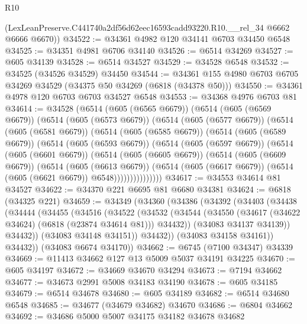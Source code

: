 \begin{lexlean}{R10}
\begin{coremodule}
      (LexLeanPreserve.C441740a2df56d62eec16593cadd93220.R10.__rel_34 @6662 @6666 @6670))
@34522 := @34361 @4982 @120 @34141 @6703 @34450 @6548
@34525 := @34351 @4981 @6706 @34140
@34526 := @6514 @34269
@34527 := @605 @34139
@34528 := @6514 @34527
@34529 := @34528 @6548
@34532 := @34525 (@34526 @34529) @34450
@34544 := @34361 @155 @4980 @6703 @6705 @34269 @34529 (@34375 @50 @34269 (@6818 (@34378 @50)))
@34550 := @34361 @4978 @120 @6703 @6703 @34527 @6548
@34553 := @34368 @4976 @6703 @81
@34614 := @34528
    (@6514
      (@605 (@6565 @6679))
      (@6514
        (@605 (@6569 @6679))
        (@6514
          (@605 (@6573 @6679))
          (@6514
            (@605 (@6577 @6679))
            (@6514
              (@605 (@6581 @6679))
              (@6514
                (@605 (@6585 @6679))
                (@6514
                  (@605 (@6589 @6679))
                  (@6514
                    (@605 (@6593 @6679))
                    (@6514
                      (@605 (@6597 @6679))
                      (@6514
                        (@605 (@6601 @6679))
                        (@6514
                          (@605 (@6605 @6679))
                          (@6514
                            (@605 (@6609 @6679))
                            (@6514
                              (@605 (@6613 @6679))
                              (@6514
                                (@605 (@6617 @6679))
                                (@6514 (@605 (@6621 @6679)) @6548)))))))))))))))
@34617 := @34553 @34614 @81 @34527
@34622 := @34370 @221 @6695 @81 @6680 @34381
@34624 := @6818 (@34325 @221)
@34659 := @34349
    (@34360
      (@34386
        (@34392
          (@34403
            (@34438
              (@34444
                (@34455
                  (@34516
                    (@34522
                      (@34532
                        (@34544
                          (@34550 (@34617 (@34622 @34624) (@6818 (@23874 @34614 @81))) @34432))
                        (@34083 @34137 @34139))
                      @34432))
                  (@34083 @34148 @34151))
                @34432))
            (@34083 @34158 @34161))
          @34432))
      (@34083 @6674 @34170))
@34662 := @6745 (@7100 @34347) @34339
@34669 := @11413 @34662 @127 @13 @5009 @5037 @34191 @34225
@34670 := @605 @34197
@34672 := @34669 @34670 @34294
@34673 := @7194 @34662
@34677 := @34673 @2991 @5008 @34183 @34190
@34678 := @605 @34185
@34679 := @6514 @34678
@34680 := @605 @34189
@34682 := @6514 @34680 @6548
@34685 := @34677 (@34679 @34682) @34670
@34686 := @6804 @34662
@34692 := @34686 @5000 @5007 @34175 @34182 @34678 @34682

\end{coremodule}
\end{lexlean}
